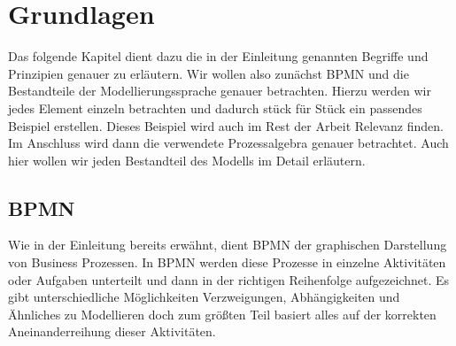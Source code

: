 
\chapter{Grundlagen} %

\label{Chapter2} %







Das folgende Kapitel dient dazu die in der Einleitung genannten Begriffe und Prinzipien genauer zu erläutern. Wir wollen also zunächst BPMN und die Bestandteile der Modellierungssprache genauer betrachten. Hierzu werden wir jedes Element einzeln betrachten und dadurch stück für Stück ein passendes Beispiel erstellen. Dieses Beispiel wird auch im Rest der Arbeit Relevanz finden. 
Im Anschluss wird dann die verwendete Prozessalgebra genauer betrachtet. Auch hier wollen wir jeden Bestandteil des Modells im Detail erläutern.
\section{BPMN}\label{BPMN}
Wie in der Einleitung bereits erwähnt, dient BPMN der graphischen Darstellung von Business Prozessen. In BPMN werden diese Prozesse in einzelne Aktivitäten oder Aufgaben unterteilt und dann in der richtigen Reihenfolge aufgezeichnet. Es gibt unterschiedliche Möglichkeiten Verzweigungen, Abhängigkeiten und Ähnliches zu Modellieren doch zum größten Teil basiert alles auf der korrekten Aneinanderreihung dieser Aktivitäten.
